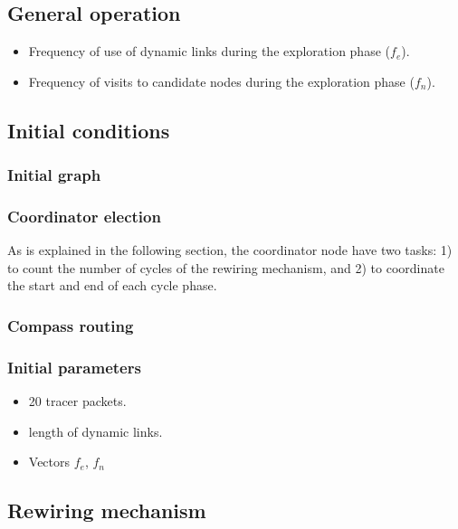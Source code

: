 \subsection{General operation}

\begin{itemize}
    \item Frequency of use of dynamic links during the exploration phase ($f_e$).
    \item Frequency of visits to candidate nodes during the exploration phase ($f_n$).
\end{itemize}

\subsection{Initial conditions}

\subsubsection{Initial graph} 

\subsubsection{Coordinator election}

As is explained in the following section, the coordinator node have two tasks: 1) to count the number of cycles of the rewiring mechanism, and 2) to coordinate the start and end of each cycle phase.

\subsubsection{Compass routing}

\subsubsection{Initial parameters}

\begin{itemize}
	\item 20 tracer packets.
	\item length of dynamic links.
	\item Vectors $f_e$, $f_n$
\end{itemize}

\subsection{Rewiring mechanism}

